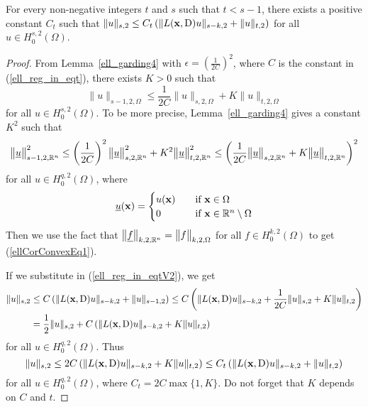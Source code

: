 \begin{cor} \label{ell_cor_convex}
For every non-negative integers $t$ and $s$ such that
$t<s-1$, there exists a positive constant $C_t$ such that
$\displaystyle \|u \|_{s,2} \leq C_t \left( \| L(\mathbf{x},\operatorname{D}) u \|_{s-k,2}
+ \|u\|_{t,2} \right)$ for all $\displaystyle u \in H^{s,2}_0(\Omega)$.
\end{cor}

\begin{proof}
From Lemma~\ref{ell_garding4} with
$\displaystyle \epsilon = \left(\frac{1}{2C}\right)^2$, where $C$ is the
constant in (\ref{ell_reg_in_eqt}), there exists $K>0$ such that
\begin{equation} \label{ellCorConvexEq1}
\|u \|_{s-1,2,\Omega} \leq \frac{1}{2C} \| u \|_{s,2,\Omega} + K \|u\|_{t,2,\Omega}
\end{equation}
for all $\displaystyle u \in H^{s,2}_0(\Omega)$.
To be more precise, Lemma~\ref{ell_garding4} gives a constant
$\displaystyle K^2$ such that
\[
\big\|\underline{u} \big\|_{s-1,2,\mathbb{R}^n}^2 \leq
\left(\frac{1}{2C}\right)^2 \big\|\underline{u}\big\|_{s,2,\mathbb{R}^n}^2
+ K^2 \big\|\underline{u}\big\|_{t,2,\mathbb{R}^n}^2
\leq \left( \frac{1}{2C} \big\| \underline{u} \big\|_{s,2,\mathbb{R}^n}
+ K \big\|\underline{u}\big\|_{t,2,\mathbb{R}^n} \right)^2
\]
for all $\displaystyle u \in H^{q,2}_0(\Omega)$, where
\[
\underline{u}(\mathbf{x}) = \begin{cases}
u(\mathbf{x}) & \quad \text{if} \ \mathbf{x} \in \Omega \\
  0 & \quad \text{if} \ \mathbf{x} \in \mathbb{R}^n \setminus \Omega
\end{cases}
\]
Then we use the fact that
$\big\|\underline{f}\big\|_{k,2,\mathbb{R}^n} = \big\|f\big\|_{k,2,\Omega}$
for all $\displaystyle f \in H^{k,2}_0(\Omega)$
to get (\ref{ellCorConvexEq1}).

If we substitute in (\ref{ell_reg_in_eqtV2}), we get
\begin{align*}
\|u \|_{s,2} &\leq C \left( \| L(\mathbf{x},\operatorname{D})u \|_{s-k,2}
+ \|u\|_{s-1,2} \right)
\leq C \left( \| L(\mathbf{x},\operatorname{D})u \|_{s-k,2} + \frac{1}{2C} \| u \|_{s,2} + K
\|u\|_{t,2} \right) \\
&= \frac{1}{2} \| u \|_{s,2} + C \left( \| L(\mathbf{x},\operatorname{D})u \|_{s-k,2}
+ K \|u\|_{t,2} \right)
\end{align*}
for all $\displaystyle u \in H^{q,2}_0(\Omega)$.  Thus
\[
\|u \|_{s,2} \leq 2C \left( \| L(\mathbf{x},\operatorname{D})u \|_{s-k,2} + K \|u\|_{t,2}
\right) \leq C_t \left( \| L(\mathbf{x},\operatorname{D})u \|_{s-k,2} + \|u\|_{t,2} \right)
\]
for all $\displaystyle u \in H^{q,2}_0(\Omega)$,
where $C_t = 2C \max \{1, K \}$.  Do not forget that $K$ depends on
$C$ and $t$.
\end{proof}

